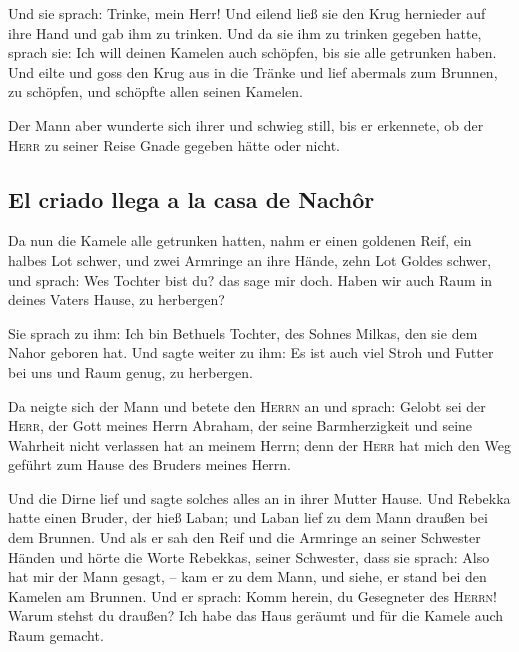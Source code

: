  Und sie sprach: Trinke, mein Herr! Und eilend ließ sie
den Krug hernieder auf ihre Hand und gab ihm zu trinken. 
Und da sie ihm zu trinken gegeben hatte, sprach sie: Ich will deinen
Kamelen auch schöpfen, bis sie alle getrunken haben.  Und
eilte und goss den Krug aus in die Tränke und lief abermals zum Brunnen,
zu schöpfen, und schöpfte allen seinen Kamelen.

 Der Mann aber wunderte sich ihrer und schwieg still, bis
er erkennete, ob der \textsc{Herr} zu seiner Reise Gnade gegeben hätte
oder nicht.

\hypertarget{el-criado-llega-a-la-casa-de-nachuxf4r}{%
\subsection{El criado llega a la casa de
Nachôr}\label{el-criado-llega-a-la-casa-de-nachuxf4r}}

 Da nun die Kamele alle getrunken hatten, nahm er einen
goldenen Reif, ein halbes Lot schwer, und zwei Armringe an ihre Hände,
zehn Lot Goldes schwer,  und sprach: Wes Tochter bist du?
das sage mir doch. Haben wir auch Raum in deines Vaters Hause, zu
herbergen?

 Sie sprach zu ihm: Ich bin Bethuels Tochter, des Sohnes
Milkas, den sie dem Nahor geboren hat.  Und sagte weiter
zu ihm: Es ist auch viel Stroh und Futter bei uns und Raum genug, zu
herbergen.

 Da neigte sich der Mann und betete den \textsc{Herrn} an
 und sprach: Gelobt sei der \textsc{Herr}, der Gott
meines Herrn Abraham, der seine Barmherzigkeit und seine Wahrheit nicht
verlassen hat an meinem Herrn; denn der \textsc{Herr} hat mich den Weg
geführt zum Hause des Bruders meines Herrn.

 Und die Dirne lief und sagte solches alles an in ihrer
Mutter Hause.  Und Rebekka hatte einen Bruder, der hieß
Laban; und Laban lief zu dem Mann draußen bei dem Brunnen.
 Und als er sah den Reif und die Armringe an seiner
Schwester Händen und hörte die Worte Rebekkas, seiner Schwester, dass
sie sprach: Also hat mir der Mann gesagt, -- kam er zu dem Mann, und
siehe, er stand bei den Kamelen am Brunnen.  Und er
sprach: Komm herein, du Gesegneter des \textsc{Herrn}! Warum stehst du
draußen? Ich habe das Haus geräumt und für die Kamele auch Raum gemacht.

